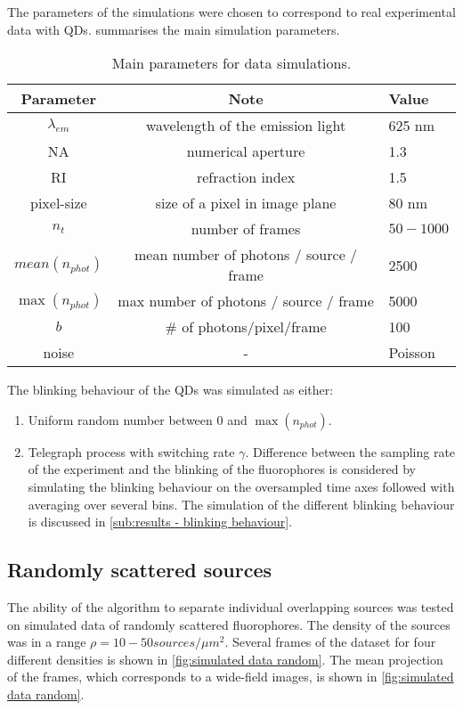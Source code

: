 The parameters of the simulations were chosen to correspond to real experimental data with QDs.   summarises the main simulation parameters. 
%
\begin{table}[!h]
	\centering
	\begin{tabular}{|c|c|l|}
		\hline 
		\bf Parameter 		& \bf Note  							& \bf Value\tabularnewline
		\hline %
		$\lambda_{em}$ 	& wavelength of the emission light 	& 625 nm\tabularnewline
		NA 				& numerical aperture 				& 1.3\tabularnewline
		RI 				& refraction index 					& 1.5\tabularnewline
		pixel-size 		& size of a pixel in image plane	& 80 nm\tabularnewline
		$n_{t}$ 			& number of frames  					& $50-1000$\tabularnewline
		$\unit{mean}(n_{phot})$ & mean number of photons / source / frame 	& 2500\tabularnewline
		$\max(n_{phot})$ & max number of photons / source / frame 	& 5000\tabularnewline
		$b$ 				& \# of photons/pixel/frame 			& 100\tabularnewline
		noise			& 	{\centering -}				& Poisson\tabularnewline
		\hline
	\end{tabular}
	\caption{Main parameters for data simulations.}
	\label{tab:Simulations parameters}
\end{table}

The blinking behaviour of the QDs was simulated as either:
%
\begin{enumerate}
	\item
	Uniform random number between $0$ and $\max(n_{phot})$.
	\item
	Telegraph process with switching rate $\gamma$. Difference between the sampling rate of the experiment and the blinking of the fluorophores is considered by simulating the blinking behaviour on the oversampled time axes followed with averaging over several bins. The simulation of the different blinking behaviour is discussed in \autoref{sub:results - blinking behaviour}. 
\end{enumerate}
 
\clearpage
\subsection{Randomly scattered sources\label{sub:Simul random}}
The ability of the algorithm to separate individual overlapping sources was tested on simulated data of randomly scattered fluorophores. The density of the sources was in a range $\rho=10-50 \unit{sources/\mu m^{2}}$. Several frames of the dataset for four different densities is shown in  \autoref{fig:simulated data random}. The mean projection of the frames, which corresponds to a wide-field images, is shown in \autoref{fig:simulated data random}.

